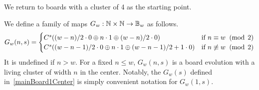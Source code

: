 \documentclass[12pt,letterpaper]{article}
\begin{document}
We return to boards with a cluster of 4 as the starting point.
\begin{dfn}\label{initCenterClusterBoards}
  We define a family of maps $G_w:\mathbb{N}\times \mathbb{N}\rightarrow \mathbb{B}_w$ as follows.
  \[ G_w(n,s)=\begin{cases}
      C^s((w-n)/2\cdot 0\oplus n\cdot 1\oplus (w-n)/2\cdot 0) & \text{if } n\equiv w \;\;(\operatorname{mod}\;2) \\
      C^s((w-n-1)/2\cdot 0\oplus n\cdot 1\oplus (w-n-1)/2 + 1\cdot 0) & \text{if } n\not\equiv w \;\;(\operatorname{mod}\;2) \end{cases} \]
  It is undefined if $n>w$. For a fixed $n\leq w$, $G_w(n, s)$ is a board evolution with a living cluster of width $n$ in the center. Notably, the $G_w(s)$ defined in~\cref{mainBoard1Center} is simply convenient notation for $G_w(1,s)$. 
\end{dfn}
\end{document}
